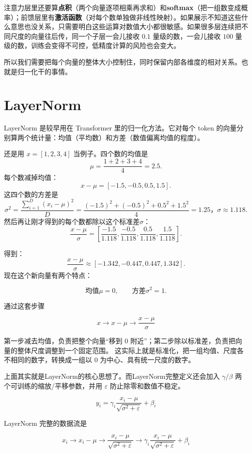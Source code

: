 \documentclass[UTF8,11pt,a4paper]{ctexart}
\begin{document}
注意力层里还要算\textbf{点积}（两个向量逐项相乘再求和）和\textbf{softmax}（把一组数变成概率）；前馈层里有\textbf{激活函数}（对每个数单独做非线性映射）。如果展示不知道这些什么意思也没关系，只需要明白这些运算对数值大小都很敏感。如果很多层连续把不同尺度的向量往后传，同一个子层一会儿接收 $0.1$ 量级的数，一会儿接收 $100$ 量级的数，训练会变得不可控，低精度计算的风险也会变大。

所以我们需要把每个向量的整体大小控制住，同时保留内部各维度的相对关系。也就是归一化干的事情。

\section{LayerNorm}

LayerNorm 是较早用在 Transformer 里的归一化方法。它对每个 token 的向量分别算两个统计量：均值（平均数）和方差（数值偏离均值的程度）。

还是用 $x=[1,2,3,4]$ 当例子。四个数的均值是
\[
\mu=\frac{1+2+3+4}{4}=2.5.
\]
每个数减掉均值：
\[
x-\mu=[-1.5,-0.5,0.5,1.5].
\]
这四个数的方差是
\[
\sigma^2=\frac{\sum_{i=1}^{D}{(x_i-\mu)^2}}{D}=\frac{(-1.5)^2+(-0.5)^2+0.5^2+1.5^2}{4}=1.25，
\sigma\approx1.118.
\]
然后再让刚才得到的每个数都除以这个标准差$\sigma$：
\[
\frac{x-\mu}{\sigma}
=
\left[
\frac{-1.5}{1.118},
\frac{-0.5}{1.118},
\frac{0.5}{1.118},
\frac{1.5}{1.118}
\right].
\]

得到：
\[
\frac{x-\mu}{\sigma}
\approx
[-1.342,-0.447,0.447,1.342].
\]
现在这个新向量有两个特点：

\[
\text{均值$\mu$}=0,
\qquad
\text{方差$\sigma^2$}=1.
\]

通过这套步骤

\[
\boxed{
x
\longrightarrow
x-\mu
\longrightarrow
\frac{x-\mu}{\sigma}
}
\]

第一步减去均值，负责把整个向量“移到 0 附近”；第二步除以标准差，负责把向量的整体尺度调整到一个固定范围。
这实际上就是标准化，把一组均值、尺度各不相同的数字，转换成一组以 0 为中心、具有统一尺度的数字。

上面其实就是LayerNorm的核心思想了。而LayerNorm完整定义还会加入 $\gamma/\beta$ 两个可训练的缩放/平移参数，并用 $\varepsilon$ 防止除零和数值不稳定。

\[
\boxed{
y_i
=
\gamma_i
\frac{x_i-\mu}
{\sqrt{\sigma^2+\varepsilon}}
+
\beta_i
}
\]

LayerNorm 完整的数据流是

\[
\boxed{
x_i
\longrightarrow
x_i-\mu
\longrightarrow
\frac{x_i-\mu}{\sqrt{\sigma^2+\varepsilon}}
\longrightarrow
\gamma_i
\frac{x_i-\mu}{\sqrt{\sigma^2+\varepsilon}}
+\beta_i
}
\]
\end{document}
